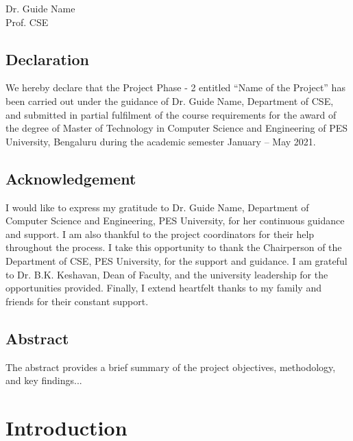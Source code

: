 \documentclass[12pt]{report}
\begin{document}
\begin{flushright}
Dr. Guide Name\\
Prof. CSE
\end{flushright}

\newpage

\section*{Declaration}

We hereby declare that the Project Phase - 2 entitled ``Name of the Project'' has been carried out under the guidance of Dr. Guide Name, Department of CSE, and submitted in partial fulfilment of the course requirements for the award of the degree of Master of Technology in Computer Science and Engineering of PES University, Bengaluru during the academic semester January – May 2021.

\newpage

\section*{Acknowledgement}

I would like to express my gratitude to Dr. Guide Name, Department of Computer Science and Engineering, PES University, for her continuous guidance and support. I am also thankful to the project coordinators for their help throughout the process. I take this opportunity to thank the Chairperson of the Department of CSE, PES University, for the support and guidance. I am grateful to Dr. B.K. Keshavan, Dean of Faculty, and the university leadership for the opportunities provided. Finally, I extend heartfelt thanks to my family and friends for their constant support.

\newpage

\section*{Abstract}

The abstract provides a brief summary of the project objectives, methodology, and key findings...

\newpage

\tableofcontents
\newpage
\listoffigures
\newpage
\listoftables
\newpage

\chapter{Introduction}
\end{document}
